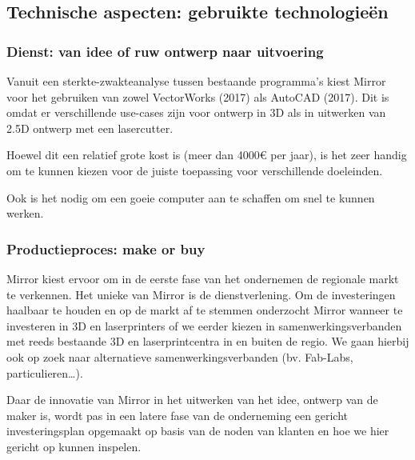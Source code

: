 \subsection{Technische aspecten: gebruikte technologieën} %
\label{sub:technische_aspecten_gebruikte_technologieën}

\subsubsection{Dienst: van idee of ruw ontwerp naar uitvoering} %
\label{ssub:dienst_van_idee_of_ruw_ontwerp_naar_uitvoering_technisch}

Vanuit een sterkte-zwakteanalyse tussen bestaande programma’s kiest Mirror voor het gebruiken van zowel VectorWorks (2017) als AutoCAD (2017). Dit is omdat er verschillende use-cases zijn voor ontwerp in 3D als in uitwerken van 2.5D ontwerp met een lasercutter.

Hoewel dit een relatief grote kost is (meer dan 4000€ per jaar), is het zeer handig om te kunnen kiezen voor de juiste toepassing voor verschillende doeleinden.

Ook is het nodig om een goeie computer aan te schaffen om snel te kunnen werken.


\subsubsection{Productieproces: make or buy} %
\label{ssub:productieproces_make_or_buy}
Mirror kiest ervoor om in de eerste fase van het ondernemen de regionale markt te verkennen. Het unieke van Mirror is de dienstverlening. Om de investeringen haalbaar te houden en op de markt af te stemmen onderzocht Mirror wanneer te investeren in 3D en laserprinters of we eerder kiezen in samenwerkingsverbanden met reeds bestaande 3D en laserprintcentra in en buiten de regio. We gaan hierbij ook op zoek naar alternatieve samenwerkingsverbanden (bv. Fab-Labs, particulieren…).

Daar de innovatie van Mirror in het uitwerken van het idee, ontwerp van de maker is, wordt pas in een latere fase van de onderneming een gericht investeringsplan opgemaakt op basis van de noden van klanten en hoe we hier gericht op kunnen inspelen.


